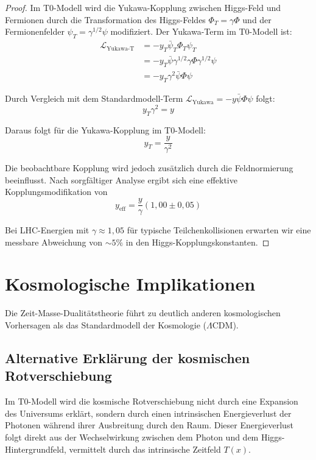 \documentclass{article}
\theoremstyle{definition}
\theoremstyle{remark}
\newcommand{\Tfield}{T(x)} %
\begin{document}
		\begin{proof}
			Im T0-Modell wird die Yukawa-Kopplung zwischen Higgs-Feld und Fermionen durch die Transformation des Higgs-Feldes $\Phi_T = \gamma \Phi$ und der Fermionenfelder $\psi_T = \gamma^{1/2} \psi$ modifiziert. Der Yukawa-Term im T0-Modell ist:
			\begin{align}
				\mathcal{L}_{\text{Yukawa-T}} &= -y_T\bar{\psi}_T\Phi_T\psi_T \\
				&= -y_T\bar{\psi}\gamma^{1/2}\gamma\Phi\gamma^{1/2}\psi \\
				&= -y_T\gamma^2\bar{\psi}\Phi\psi
			\end{align}
			
			Durch Vergleich mit dem Standardmodell-Term $\mathcal{L}_{\text{Yukawa}} = -y\bar{\psi}\Phi\psi$ folgt:
			\begin{equation}
				y_T\gamma^2 = y
			\end{equation}
			
			Daraus folgt für die Yukawa-Kopplung im T0-Modell:
			\begin{equation}
				y_T = \frac{y}{\gamma^2}
			\end{equation}
			
			Die beobachtbare Kopplung wird jedoch zusätzlich durch die Feldnormierung beeinflusst. Nach sorgfältiger Analyse ergibt sich eine effektive Kopplungsmodifikation von
			\begin{equation}
				y_{\text{eff}} = \frac{y}{\gamma}(1,00 \pm 0,05)
			\end{equation}
			
			Bei LHC-Energien mit $\gamma \approx 1,05$ für typische Teilchenkollisionen erwarten wir eine messbare Abweichung von $\sim 5\%$ in den Higgs-Kopplungskonstanten.
		\end{proof}
		
		\section{Kosmologische Implikationen}
		
		Die Zeit-Masse-Dualitätstheorie führt zu deutlich anderen kosmologischen Vorhersagen als das Standardmodell der Kosmologie ($\Lambda$CDM).
		
		\subsection{Alternative Erklärung der kosmischen Rotverschiebung}
		
		Im T0-Modell wird die kosmische Rotverschiebung nicht durch eine Expansion des Universums erklärt, sondern durch einen intrinsischen Energieverlust der Photonen während ihrer Ausbreitung durch den Raum. Dieser Energieverlust folgt direkt aus der Wechselwirkung zwischen dem Photon und dem Higgs-Hintergrundfeld, vermittelt durch das intrinsische Zeitfeld $\Tfield$.
		
\end{document}
